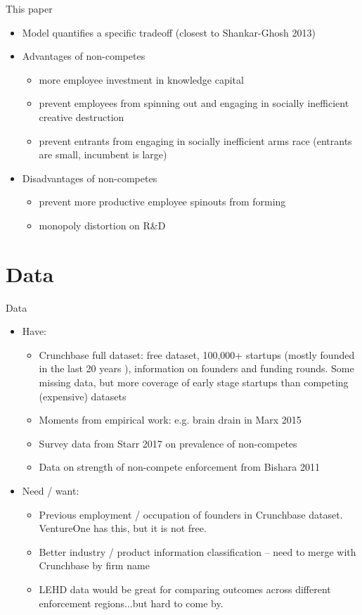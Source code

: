 \documentclass[english,usenames,dvipsnames]{beamer}
\begin{document}
\begin{frame}{This paper}
\begin{itemize}
	\item Model quantifies a specific tradeoff (closest to Shankar-Ghosh 2013)
	\item Advantages of non-competes
	\begin{itemize}
		\item more employee investment in knowledge capital 
		\item prevent employees from spinning out and engaging in socially inefficient creative destruction
		\item prevent entrants from engaging in socially inefficient arms race (entrants are small, incumbent is large)
	\end{itemize}
	\item Disadvantages of non-competes
	\begin{itemize}
		\item prevent more productive employee spinouts from forming
		\item monopoly distortion on R\&D 
	\end{itemize}
\end{itemize}
\end{frame}

\section{Data}
\begin{frame}{Data}
\label{Data}
\begin{itemize}
	\item Have:
	\begin{itemize}
		\item Crunchbase full dataset: free dataset, 100,000+ startups (mostly founded in the last 20 years \hyperlink{crunchbase_founding_dates_coverage}{}), information on founders and funding rounds. Some missing data, but more coverage of early stage startups than competing (expensive) datasets
		\item Moments from empirical work: e.g. brain drain in Marx 2015
		\item Survey data from Starr 2017 on prevalence of non-competes
		\item Data on strength of non-compete enforcement from Bishara 2011
	\end{itemize}
	\item Need / want: 
	\begin{itemize}
		\item Previous employment / occupation of founders in Crunchbase dataset. VentureOne has this, but it is not free.
		\item Better industry / product information classification -- need to merge with Crunchbase by firm name
		\item LEHD data would be great for comparing outcomes across different enforcement regions...but hard to come by. 
	\end{itemize}
\end{itemize}
\end{frame}
\end{document}
